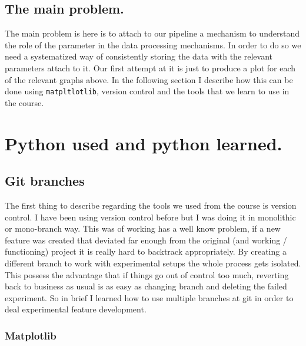 \documentclass[11pt,a4paper]{article}
\begin{document}
\subsection{The main problem.}\label{the-main-problem.}

The main problem is here is to attach to our pipeline a mechanism to
understand the role of the parameter in the data processing mechanisms.
In order to do so we need a systematized way of consistently storing the
data with the relevant parameters attach to it. Our first attempt at it
is just to produce a plot for each of the relevant graphs above. In the
following section I describe how this can be done using
\texttt{matpltlotlib}, version control and the tools that we learn to
use in the course.

\section{Python used and python
learned.}\label{python-used-and-python-learned.}

\subsection{Git branches}\label{git-branches}

The first thing to describe regarding the tools we used from the course is
version control. I have been using version control before but I was
doing it in monolithic or mono-branch way. This was of working has a well know problem, if a new feature was created that deviated far enough from the
original (and working / functioning) project it is really hard to backtrack
appropriately. By creating a different branch to work with
experimental setups the whole process gets isolated. This possess the advantage that if things go out
of control too much, reverting back to business as usual is as easy as
changing branch and deleting the failed experiment. So in brief I learned how to
use multiple branches at git in order to deal experimental feature
development.

\subsubsection{Matplotlib}\label{matplotlib}
\end{document}
